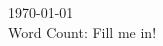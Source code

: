 \begin{titlepage}


{\large \today}\\[0.5cm] %

{\large Word Count: Fill me in!}\\[2cm]


\\[1cm]
 

\vfill %

\end{titlepage}
